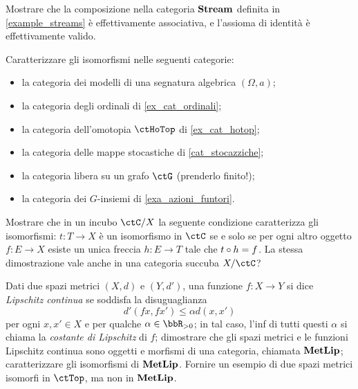 \begin{esercizi}
	\item Mostrare che la composizione nella categoria \(\mathbf{Stream}\) definita in \ref{example_streams} è effettivamente associativa, e l'assioma di identità è effettivamente valido.
	\item Caratterizzare gli isomorfismi nelle seguenti categorie:
	\begin{itemize}
		\item la categoria dei modelli di una segnatura algebrica \((\Omega,a)\);
		\item la categoria degli ordinali di \ref{ex_cat_ordinali};
		\item la categoria dell'omotopia \(\ctHoTop\) di \ref{ex_cat_hotop};
		\item la categoria delle mappe stocastiche di \ref{cat_stocazziche};
		\item la categoria libera su un grafo \(\ctG\) (prenderlo finito!);
		\item la categoria dei \(G\)-insiemi di \ref{exa_azioni_funtori}.
	\end{itemize}
	Mostrare che in un incubo \(\ctC/X\) la seguente condizione caratterizza gli isomorfismi: \(t : T\to X\) è un isomorfismo in \(\ctC\) se e solo se per ogni altro oggetto \(f : E\to X\) esiste un unica freccia \(h : E\to T\) tale che \(t\circ h=f\). La stessa dimostrazione vale anche in una categoria succuba \(X/\ctC\)?
	\item Dati due spazi metrici \((X,d)\) e \((Y,d')\), una funzione \(f:X\to Y\) si dice \emph{Lipschitz continua} se soddisfa la disuguaglianza
	\[
		d'(fx,fx')\le \alpha d(x,x')
	\]
	per ogni \(x,x'\in X\) e per qualche \(\alpha\in\bbR_{>0}\); in tal caso, l'inf di tutti questi \(\alpha\) si chiama la \emph{costante di Lipschitz} di \(f\); dimostrare che gli spazi metrici e le funzioni Lipschitz continua sono oggetti e morfismi di una categoria, chiamata \(\mathbf{MetLip}\); caratterizzare gli isomorfismi di \(\mathbf{MetLip}\). Fornire un esempio di due spazi metrici isomorfi in \(\ctTop\), ma non in \(\mathbf{MetLip}\).


\end{esercizi}
